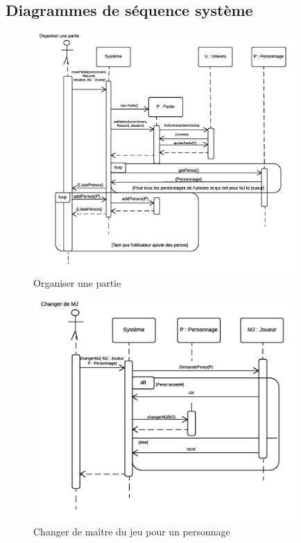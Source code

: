 \documentclass[a4paper,oneside,10pt]{article}
\begin{document}
\subsection{Diagrammes de séquence système}
\begin{figure}[H]
	\begin{center}
		\includegraphics[width=10cm]{images/sequence/DS-OrganiserPartie.png}  
		\caption{Organiser une partie}
	\end{center}
\end{figure}
\begin{figure}[H]
	\begin{center}
		\includegraphics[width=10cm]{images/sequence/DS-ChangerMJ.png}  
		\caption{Changer de maître du jeu pour un personnage}
	\end{center}
\end{figure}
\end{document}
